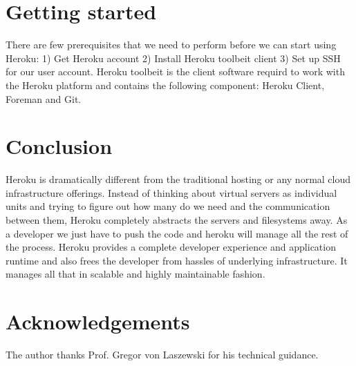 \documentclass[9pt,twocolumn,twoside]{../../styles/osajnl}
\begin{document}
\section{Getting started}
	There are few prerequisites that we need to perform before we can start using
	Heroku: 1) Get Heroku account 2) Install Heroku toolbeit client\cite{Toolbeit} 
	3) Set up SSH for our user account. Heroku toolbeit is the client software
	requird to work with the Heroku platform and contains the following component:
	Heroku Client, Foreman and Git.

\section{Conclusion}
	Heroku is dramatically different from the traditional hosting or any normal
	cloud infrastructure offerings. Instead of thinking about virtual servers as
	individual units and trying to figure out how many do we need and the
	communication between them, Heroku completely abstracts the servers and
	filesystems away. As a developer we just have to push the code and heroku will 
	manage all the rest of the process. Heroku provides a complete developer
	experience and application runtime and also frees the developer from hassles of
	underlying infrastructure. It manages all that in scalable and highly
	maintainable fashion.

\section*{Acknowledgements}

	The author thanks Prof. Gregor von Laszewski for his technical guidance.



\end{document}
